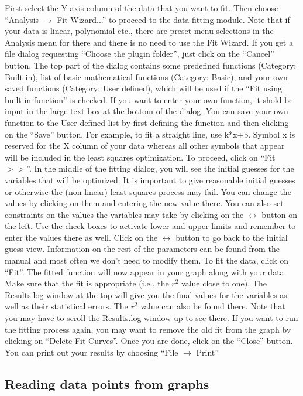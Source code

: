 \documentclass[byrevtex,amssymb,aps,pra,floatfix,letterpaper]{revtex4}
\begin{document}
First select the Y-axis column of the data that you want to fit. Then choose ``Analysis $\rightarrow$ Fit Wizard...'' to proceed to the data fitting module. Note that if your data is linear, polynomial etc., there are preset menu selections in the Analysis menu for there and there is no need to use the Fit Wizard. If you get a file dialog requesting ``Choose the plugin folder'', just click on the ``Cancel'' button. The top part of the dialog contains some predefined functions (Category: Built-in), list of basic mathematical functions (Category: Basic), and your own saved functions (Category: User defined), which will be used if the ``Fit using built-in function'' is checked. If you want to enter your own function, it shold be input in the large text box at the bottom of the dialog. You can save your own function to the User defined list by first defining the function and then clicking on the ``Save'' button. For example, to fit a straight line, use k*x+b. Symbol x is reserved for the X column of your data whereas all other symbols that appear will be included in the least squares optimization. To proceed, click on ``Fit $>>$''. In the middle of the fitting dialog, you will see the initial guesses for the variables that will be optimized. It is important to give reasonable initial guesses or otherwise the (non-linear) least squares process may fail. You can change the values by clicking on them and entering the new value there. You can also set constraints on the values the variables may take by clicking on the $\leftrightarrow$ button on the left. Use the check boxes to activate lower and upper limits and remember to enter the values there as well. Click on the $\leftrightarrow$ button to go back to the initial guess view. Information on the rest of the parameters can be found from the manual and most often we don't need to modify them. To fit the data, click on ``Fit''. The fitted function will now appear in your graph along with your data. Make sure that the fit is appropriate (i.e., the $r^2$ value close to one). The Results.log window at the top will give you the final values for the variables as well as their statistical errors. The $r^2$ value can also be found there. Note that you may have to scroll the Results.log window up to see there. If you want to run the fitting process again, you may want to remove the old fit from the graph by clicking on ``Delete Fit Curves''. Once you are done, click on the ``Close'' button. You can print out your results by choosing ``File $\rightarrow$ Print''

\subsection{Reading data points from graphs}
\end{document}
